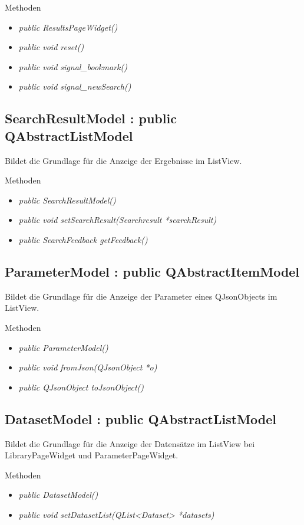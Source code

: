 Methoden
\begin{itemize}
	\item\textit{public ResultsPageWidget()}
	\item\textit{public void reset()}
	\item\textit{public void signal\_bookmark()}
	\item\textit{public void signal\_newSearch()}
\end{itemize}

\subsection*{SearchResultModel : public QAbstractListModel}
Bildet die Grundlage für die Anzeige der Ergebnisse im ListView.

Methoden
\begin{itemize}
	\item\textit{public SearchResultModel()}
	\item\textit{public void setSearchResult(Searchresult *searchResult)}
	\item\textit{public SearchFeedback getFeedback()}
\end{itemize}

\subsection*{ParameterModel : public QAbstractItemModel}
Bildet die Grundlage für die Anzeige der Parameter eines QJsonObjects im ListView.

Methoden
\begin{itemize}
	\item\textit{public ParameterModel()}
	\item\textit{public void fromJson(QJsonObject *o)}
	\item\textit{public QJsonObject toJsonObject()}
\end{itemize}

\subsection*{DatasetModel : public QAbstractListModel}
Bildet die Grundlage für die Anzeige der Datensätze im ListView bei LibraryPageWidget und ParameterPageWidget.

Methoden
\begin{itemize}
	\item\textit{public DatasetModel()}
	\item\textit{public void setDatasetList(QList<Dataset> *datasets)}
\end{itemize}

